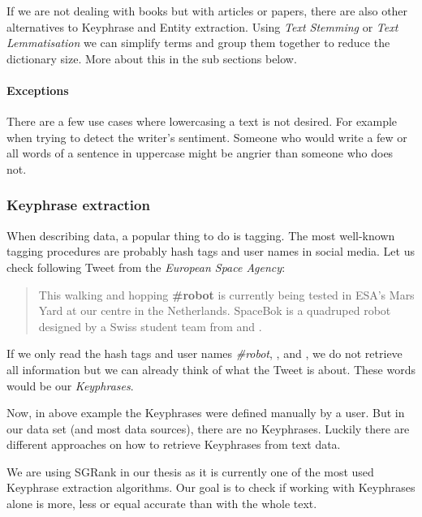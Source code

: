 If we are not dealing with books but with articles or papers,
there are also other alternatives to Keyphrase and Entity extraction.
Using \textit{Text Stemming} or \textit{Text Lemmatisation} we can simplify terms and group them together to reduce
the dictionary size.
More about this in the sub sections below.

\paragraph{Exceptions}
There are a few use cases where lowercasing a text is not desired.
For example when trying to detect the writer's sentiment.
Someone who would write a few or all words of a sentence in uppercase might be angrier than someone who does not.

\subsubsection{Keyphrase extraction}
When describing data, a popular thing to do is tagging.
The most well-known tagging procedures are probably hash tags and user names in social media.
Let us check following Tweet from the \textit{European Space Agency}\cite{ESATweet}:

\begin{quotation}
    This walking and hopping \textbf{\#robot} is currently being tested in ESA’s Mars Yard
    at our \textbf{} centre in the Netherlands.
    SpaceBok is a quadruped robot designed by a Swiss student team from \textbf{}
    and \textbf{}.
\end{quotation}

If we only read the hash tags and user names \textit{\#robot}, \textit{},
\textit{} and \textit{},
we do not retrieve all information but we can already think of what the Tweet is about.
These words would be our \textit{Keyphrases}.

Now, in above example the Keyphrases were defined manually by a user.
But in our data set (and most data sources), there are no Keyphrases.
Luckily there are different approaches on how to retrieve Keyphrases from text data.

We are using SGRank\cite{SGRank} in our thesis as it is currently one of the most used
Keyphrase extraction algorithms.
Our goal is to check if working with Keyphrases alone is more, less or equal accurate
than with the whole text.

